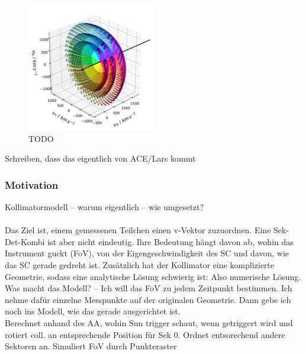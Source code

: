 \begin{figure}[h]
	\includegraphics[width=0.5\textwidth]{Figures/col_shells.pdf}
	\centering
	\caption{TODO}
	\label{TODO}
\end{figure}
Schreiben, dass das eigentlich von ACE/Lars kommt

\subsubsection{Motivation}
Kollimatormodell -- warum eigentlich -- wie umgesetzt?\\ \\
Das Ziel ist, einem gemessenen Teilchen einen v-Vektor zuzuordnen. Eine Sek-Det-Kombi ist aber nicht eindeutig. Ihre Bedeutung hängt davon ab, wohin das Instrument guckt (FoV), von der Eigengeschwindigkeit des SC und davon, wie das SC gerade gedreht ist. Zusätzlich hat der Kollimator eine komplizierte Geometrie, sodass eine analytische Lösung schwierig ist: Also numerische Lösung. \\
Was macht das Modell? -- Ich will das FoV zu jedem Zeitpunkt bestimmen. Ich nehme dafür einzelne Messpunkte auf der originalen Geometrie. Dann gebe ich noch ins Modell, wie das gerade ausgerichtet ist.\\
Berechnet anhand des AA, wohin Sun trigger schaut, wenn getriggert wird und rotiert coll. an entsprechende Position für Sek 0. Ordnet entsorechend andere Sektoren an.
Simuliert FoV durch Punkteraster \\
